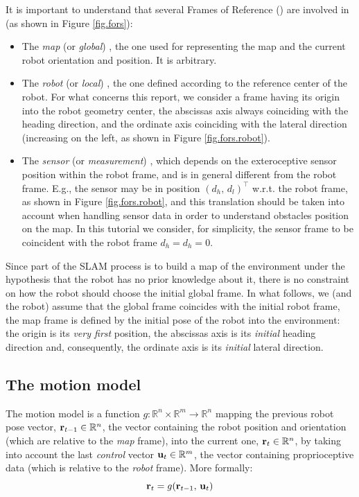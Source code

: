 It is important to understand that several Frames of Reference (\FoR{}) are involved in \SLAM{} (as shown in Figure \ref{fig.fors}):
\begin{itemize}
	\item The \emph{map} (or \emph{global}) \FoR{}, \ie{} the one used for representing the map and the current robot orientation and position. 
	It is arbitrary.
	
	\item The \emph{robot} (or \emph{local}) \FoR{}, \ie{} the one defined according to the reference center of the robot. 
	For what concerns this report, we consider a frame having its origin into the robot geometry center, the abscissas axis always coinciding with the heading direction, and the ordinate axis coinciding with the lateral direction (increasing on the left, as shown in Figure \ref{fig.fors.robot}).
	
	\item The \emph{sensor} (or \emph{measurement}) \FoR{}, which depends on the exteroceptive sensor position within the robot frame, and is in general different from the robot frame. 
	E.g., the sensor may be in position $(d_h,\, d_l)^\top$ w.r.t. the robot frame, as shown in Figure \ref{fig.fors.robot}, and this translation should be taken into account when handling sensor data in order to understand obstacles position on the map.
	In this tutorial we consider, for simplicity, the sensor frame to be coincident with the robot frame \ie{} $d_h = d_h = 0$.
	
\end{itemize}

Since part of the SLAM process is to build a map of the environment under the hypothesis that the robot has no prior knowledge about it, there is no constraint on how the robot should choose the initial global frame.
In what follows, we (and the robot) assume that the global frame coincides with the initial robot frame, \ie{} the map frame is defined by the initial pose of the robot into the environment: the origin is its \emph{very first} position, the abscissas axis is its \emph{initial} heading direction and, consequently, the ordinate axis is its \emph{initial} lateral direction.

\subsection{The motion model}
	The motion model is a function $g : \mathbb{R}^n \times \mathbb{R}^m \rightarrow \mathbb{R}^n$ mapping the previous robot pose vector, $\boldsymbol{\mathrm{{r}}}_{t-1} \in \mathbb{R}^n$, \ie{} the vector containing the robot position and orientation (which are relative to the \emph{map} frame), into the current one, $\boldsymbol{\mathrm{{r}}}_t \in \mathbb{R}^n$, by taking into account the last \emph{control} vector $\boldsymbol{\mathrm{{u}}}_t \in \mathbb{R}^m$, \ie{} the vector containing proprioceptive data (which is relative to the \emph{robot} frame). 
	More formally:
	\[
		\boldsymbol{\mathrm{{r}}}_t = g(\boldsymbol{\mathrm{{r}}}_{t-1},\, \boldsymbol{\mathrm{{u}}}_t)
	\]
	

